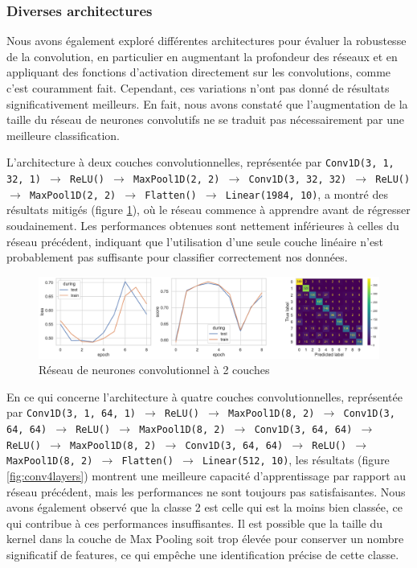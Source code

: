 \documentclass{article}
\begin{document}
\subsubsection{Diverses architectures}

Nous avons également exploré différentes architectures pour évaluer la robustesse de la convolution, en particulier en augmentant la profondeur des réseaux et en appliquant des fonctions d'activation directement sur les convolutions, comme c'est couramment fait. Cependant, ces variations n'ont pas donné de résultats significativement meilleurs. En fait, nous avons constaté que l'augmentation de la taille du réseau de neurones convolutifs ne se traduit pas nécessairement par une meilleure classification.

L'architecture à deux couches convolutionnelles, représentée par \texttt{Conv1D(3, 1, 32, 1) $\rightarrow$ ReLU() $\rightarrow$ MaxPool1D(2, 2) $\rightarrow$ Conv1D(3, 32, 32) $\rightarrow$ ReLU() $\rightarrow$ MaxPool1D(2, 2) $\rightarrow$ Flatten() $\rightarrow$ Linear(1984, 10)}, a montré des résultats mitigés (figure \ref{fig:conv2layers}), où le réseau commence à apprendre avant de régresser soudainement. Les performances obtenues sont nettement inférieures à celles du réseau précédent, indiquant que l'utilisation d'une seule couche linéaire n'est probablement pas suffisante pour classifier correctement nos données.

\begin{figure}[htbp]
    \centering
    \includegraphics[width=\textwidth]{conv/conv_2layers.pdf}
    \caption{Réseau de neurones convolutionnel à 2 couches}
    \label{fig:conv2layers}
\end{figure}

En ce qui concerne l'architecture à quatre couches convolutionnelles, représentée par \texttt{Conv1D(3, 1, 64, 1) $\rightarrow$ ReLU() $\rightarrow$ MaxPool1D(8, 2) $\rightarrow$ Conv1D(3, 64, 64) $\rightarrow$ ReLU() $\rightarrow$ MaxPool1D(8, 2) $\rightarrow$ Conv1D(3, 64, 64) $\rightarrow$ ReLU() $\rightarrow$ MaxPool1D(8, 2) $\rightarrow$ Conv1D(3, 64, 64) $\rightarrow$ ReLU() $\rightarrow$ MaxPool1D(8, 2) $\rightarrow$ Flatten() $\rightarrow$ Linear(512, 10)}, les résultats (figure \ref{fig:conv4layers}) montrent une meilleure capacité d'apprentissage par rapport au réseau précédent, mais les performances ne sont toujours pas satisfaisantes. Nous avons également observé que la classe 2 est celle qui est la moins bien classée, ce qui contribue à ces performances insuffisantes. Il est possible que la taille du kernel dans la couche de Max Pooling soit trop élevée pour conserver un nombre significatif de features, ce qui empêche une identification précise de cette classe.
\end{document}
